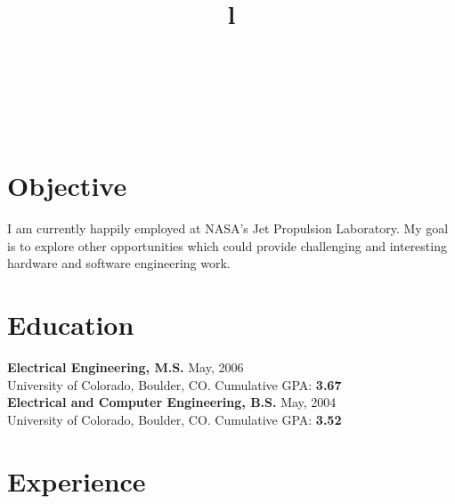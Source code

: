 \begin{resume}

\begin{format}
\title{l}\\
\\
\body\\
\end{format}

\section{\sc Objective}
I am currently happily employed at NASA's Jet Propulsion Laboratory. My goal is to explore other opportunities which could provide challenging and interesting hardware and software engineering work.
\section{\sc Education}
{\bf Electrical Engineering, M.S.} May, 2006\\
University of Colorado, Boulder, CO. \newline
Cumulative GPA: {\bf 3.67} \\

{\bf Electrical and Computer Engineering, B.S.} May, 2004\\
University of Colorado, Boulder, CO. \newline
Cumulative GPA: {\bf 3.52}\\
\section{\sc Experience}


\end{resume}
